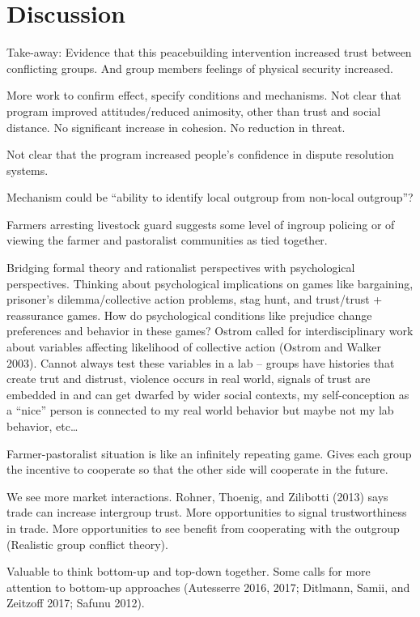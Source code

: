 \documentclass[11pt]{article}
\begin{document}
\hypertarget{discussion}{%
\section{Discussion}\label{discussion}}

Take-away: Evidence that this peacebuilding intervention increased trust
between conflicting groups. And group members feelings of physical
security increased.

More work to confirm effect, specify conditions and mechanisms. Not
clear that program improved attitudes/reduced animosity, other than
trust and social distance. No significant increase in cohesion. No
reduction in threat.

Not clear that the program increased people's confidence in dispute
resolution systems.

Mechanism could be ``ability to identify local outgroup from non-local
outgroup''?

Farmers arresting livestock guard suggests some level of ingroup
policing or of viewing the farmer and pastoralist communities as tied
together.

Bridging formal theory and rationalist perspectives with psychological
perspectives. Thinking about psychological implications on games like
bargaining, prisoner's dilemma/collective action problems, stag hunt,
and trust/trust + reassurance games. How do psychological conditions
like prejudice change preferences and behavior in these games? Ostrom
called for interdisciplinary work about variables affecting likelihood
of collective action (Ostrom and Walker 2003). Cannot always test these
variables in a lab -- groups have histories that create trut and
distrust, violence occurs in real world, signals of trust are embedded
in and can get dwarfed by wider social contexts, my self-conception as a
``nice'' person is connected to my real world behavior but maybe not my
lab behavior, etc\ldots{}

Farmer-pastoralist situation is like an infinitely repeating game. Gives
each group the incentive to cooperate so that the other side will
cooperate in the future.

We see more market interactions. Rohner, Thoenig, and Zilibotti (2013)
says trade can increase intergroup trust. More opportunities to signal
trustworthiness in trade. More opportunities to see benefit from
cooperating with the outgroup (Realistic group conflict theory).

Valuable to think bottom-up and top-down together. Some calls for more
attention to bottom-up approaches (Autesserre 2016, 2017; Ditlmann,
Samii, and Zeitzoff 2017; Safunu 2012).
\end{document}
